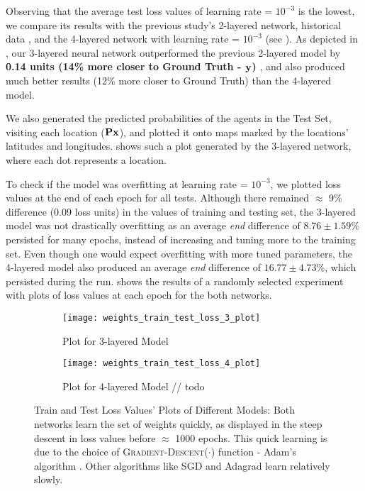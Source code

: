 Observing that the average test loss values of learning rate = $10^{-3}$ is the lowest, we compare its results with the previous study's 2-layered network, historical data \cite[Table 1]{Xue2016Avi2}, and the 4-layered network with learning rate = $10^{-3}$ (see ). As depicted in , our 3-layered neural network outperformed the previous 2-layered model by \textbf{0.14 units (14\% more closer to Ground Truth - $\mathbf{y}$)} \cite[Table 1]{Xue2016Avi2}, and also produced much better results (12\% more closer to Ground Truth) than the 4-layered model.

We also generated the predicted probabilities of the agents in the Test Set, visiting each location ($\mathbf{P}\mathbf{x}$), and plotted it onto maps marked by the locations' latitudes and longitudes.  shows such a plot generated by the 3-layered network, where each dot represents a location.

To check if the model was overfitting at learning rate = $10^{-3}$, we plotted loss values at the end of each epoch for all tests. Although there remained $\approx$ 9\% difference (0.09 loss units) in the values of training and testing set, the 3-layered model was not drastically overfitting as an average \textit{end} difference of $8.76 \pm 1.59$\% persisted for many epochs, instead of increasing and tuning more to the training set. Even though one would expect overfitting with more tuned parameters, the 4-layered model also  produced an average \textit{end} difference of $16.77 \pm 4.73\%$, which persisted during the run.  shows the results of a randomly selected experiment with plots of loss values at each epoch for the both networks.
\begin{figure}[!htbp]
    \centering
    \begin{subfigure}{.49\textwidth}
        \centering
        \texttt{[image: weights\_train\_test\_loss\_3\_plot]}
        \caption{Plot for 3-layered Model}
        \label{fig:Plot for 3-layered Model}
    \end{subfigure}
    \begin{subfigure}{.49\textwidth}
        \centering
        \texttt{[image: weights\_train\_test\_loss\_4\_plot]}
        \caption{Plot for 4-layered Model // todo}
        \label{fig:Plot for 4-layered Model}
    \end{subfigure}
    \caption[Train and Test Loss Values' Plots of Different Models]{Train and Test Loss Values' Plots of Different Models: Both networks learn the set of weights quickly, as displayed in the steep descent in loss values before $\approx$ 1000 epochs. This quick learning is due to the choice of \textsc{Gradient-Descent}($\cdot$) function - Adam's algorithm \cite{Adam}. Other algorithms like SGD \cite{SGD} and Adagrad \cite{Adagrad} learn relatively slowly.}
    \label{fig:Train & Test Loss Values' Plots of Different Models}
\end{figure}


